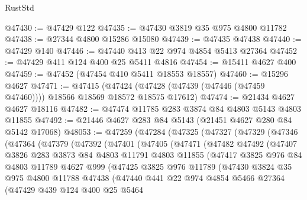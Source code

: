 \begin{lexlean}{RustStd}
\begin{coremodule}
@47430 := @47429 @122
@47435 := @47430 @3819 @35 @975 @4800 @11782
@47438 := @27344 @4800 @15286 @15080
@47439 := @47435 @47438
@47440 := @47429 @140
@47446 := @47440 @413 @22 @974 @4854 @5413 @27364
@47452 := @47429 @411 @124 @400 @25 @5411 @4816
@47454 := @15411 @4627 @400
@47459 := @47452 (@47454 @410 @5411 @18553 @18557)
@47460 := @15296 @4627
@47471 := @47415
    (@47424 (@47428 (@47439 (@47446 (@47459 @47460)))) @18566 @18569 @18572 @18575 @17612)
@47474 := @21434 @4627 @4627 @18116
@47482 := @47474 @11785 @283 @3874 @84 @4803 @5143 @4803 @11855
@47492 := @21446 @4627 @283 @84 @5143 (@21451 @4627 @280 @84 @5142 @17068)
@48053 := @47259
    (@47284
      (@47325
        (@47327
          (@47329
            (@47346
              (@47364
                (@47379
                  (@47392
                    (@47401
                      (@47405
                        (@47471
                          (@47482
                            @47492
                            (@47407
                              @3826
                              @283
                              @3873
                              @84
                              @4803
                              @11791
                              @4803
                              @11855
                              (@47417
                                @3825
                                @976
                                @84
                                @4803
                                @11789
                                @4627
                                @999
                                (@47425
                                  @3825
                                  @976
                                  @11789
                                  (@47430
                                    @3824
                                    @35
                                    @975
                                    @4800
                                    @11788
                                    @47438
                                    (@47440
                                      @441
                                      @22
                                      @974
                                      @4854
                                      @5466
                                      @27364
                                      (@47429
                                        @439
                                        @124
                                        @400
                                        @25
                                        @5464

\end{coremodule}
\end{lexlean}
